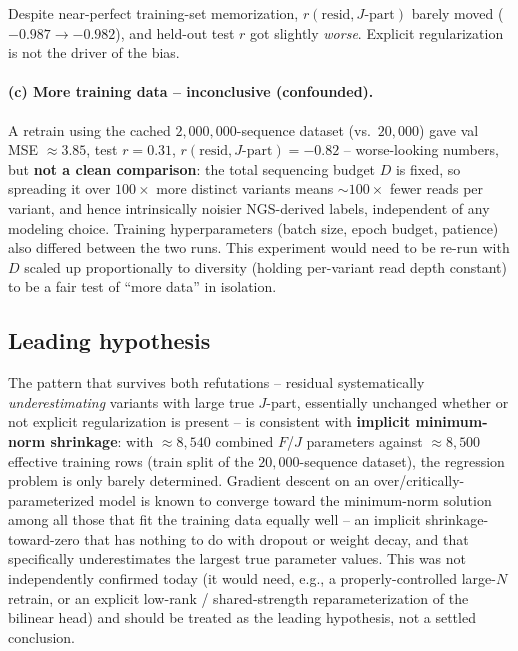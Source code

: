 \documentclass[11pt]{article}
\begin{document}
Despite near-perfect training-set memorization, $r(\text{resid}, J\text{-part})$ barely moved
($-0.987 \to -0.982$), and held-out test $r$ got slightly \emph{worse}. Explicit regularization is
not the driver of the bias.

\paragraph{(c) More training data -- inconclusive (confounded).} A retrain using the cached
$2{,}000{,}000$-sequence dataset (vs.\ $20{,}000$) gave val MSE $\approx 3.85$, test $r = 0.31$,
$r(\text{resid}, J\text{-part}) = -0.82$ -- worse-looking numbers, but \textbf{not a clean
comparison}: the total sequencing budget $D$ is fixed, so spreading it over $100\times$ more
distinct variants means $\sim\!100\times$ fewer reads per variant, and hence intrinsically noisier
NGS-derived labels, independent of any modeling choice. Training hyperparameters (batch size,
epoch budget, patience) also differed between the two runs. This experiment would need to be
re-run with $D$ scaled up proportionally to diversity (holding per-variant read depth constant) to
be a fair test of ``more data'' in isolation.

\subsection{Leading hypothesis}

The pattern that survives both refutations -- residual systematically \emph{underestimating}
variants with large true $J\text{-part}$, essentially unchanged whether or not explicit
regularization is present -- is consistent with \textbf{implicit minimum-norm shrinkage}: with
$\approx\!8{,}540$ combined $F$/$J$ parameters against $\approx\!8{,}500$ effective training rows
(train split of the $20{,}000$-sequence dataset), the regression problem is only barely determined.
Gradient descent on an over/critically-parameterized model is known to converge toward the
minimum-norm solution among all those that fit the training data equally well -- an implicit
shrinkage-toward-zero that has nothing to do with dropout or weight decay, and that specifically
underestimates the largest true parameter values. This was not independently confirmed today (it
would need, e.g., a properly-controlled large-$N$ retrain, or an explicit low-rank / shared-strength
reparameterization of the bilinear head) and should be treated as the leading hypothesis, not a
settled conclusion.
\end{document}
